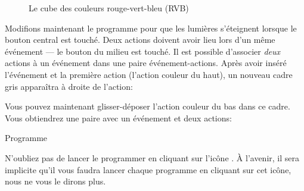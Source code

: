\begin{figure}
\caption{Le cube des couleurs rouge-vert-bleu (RVB)}\label{fig.cube}
\end{figure}


Modifions maintenant le programme pour que les lumières s'éteignent lorsque le bouton central est touché.
Deux actions doivent avoir lieu lors d'un même événement --- le bouton du milieu est touché.
Il est possible d'associer \emph{deux} actions à un événement
dans une paire événement-actions.
Après avoir inséré l'événement et la première action (l'action couleur du haut), un nouveau cadre gris apparaîtra à droite de l'action:


Vous pouvez maintenant glisser-déposer l'action couleur du bas 
dans ce cadre.
Vous obtiendrez une paire avec un événement et deux actions:\label{p.mulitple}


{\raggedleft \hfill Programme }

N'oubliez pas de lancer le programmer en cliquant sur l'icône .
À l'avenir, il sera implicite qu'il vous faudra lancer chaque programme en cliquant sur cet icône, nous ne vous le dirons plus.

\bigskip

